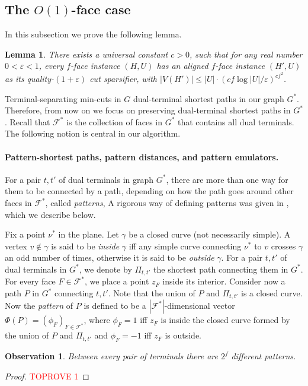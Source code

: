\documentclass[11pt]{article}
\newtheorem{lemma}[theorem]{Lemma}
\newtheorem{observation}[theorem]{Observation}
\theoremstyle{definition}
\newcommand{\fset}{{\mathcal{F}}}
\newcommand{\eps}{{\varepsilon}}
\newcounter{note}
\newcommand{\pat}{\Phi}
\begin{document}
\subsection{The $O(1)$-face case}

In this subsection we prove the following lemma.

\begin{lemma}
	\label{lem: O(1) face}
	There exists a universal constant $c>0$, such that for any real number $0<\eps<1$, every $f$-face instance $(H,U)$ has an aligned $f$-face instance $(H',U)$ as its quality-$(1+\eps)$ cut sparsifier, with $|V(H')|\le |U|\cdot (cf\log |U|/\eps)^{cf^2}$.
\end{lemma}

Terminal-separating min-cuts in $G$ dual-terminal shortest paths in our graph $G^*$. Therefore, from now on we focus on preserving dual-terminal shortest paths in $G^*$. Recall that $\fset^*$ is the collection of faces in $G^*$ that contains all dual terminals. The following notion is central in our algorithm.


\paragraph{Pattern-shortest paths, pattern distances, and pattern emulators.}
For a pair $t,t'$ of dual terminals in graph $G^*$, there are more than one way for them to be connected by a path, depending on how the path goes around other faces in $\fset^*$, called \emph{patterns},  A rigorous way of defining patterns was given in \cite{krauthgamer2017refined}, which we describe below.

Fix a point $\nu^*$ in the plane.
Let $\gamma$ be a closed curve (not necessarily simple). A vertex $v\notin \gamma$ is said to be \emph{inside} $\gamma$ iff any simple curve connecting $\nu^*$ to $v$ crosses $\gamma$ an odd number of times, otherwise it is said to be \emph{outside} $\gamma$.
For a pair $t,t'$ of dual terminals in $G^*$, we denote by $\Pi_{t,t'}$ the shortest path connecting them in $G^*$.
For every face $F\in \fset^*$, we place a point $z_F$ inside its interior. Consider now a path $P$ in $G^*$ connecting $t,t'$. Note that the union of $P$ and $\Pi_{t,t'}$ is a closed curve. Now the \emph{pattern} of $P$ is defined to be a $|\fset^*|$-dimensional vector $\pat(P)=(\phi_F)_{F\in \fset^*}$, where $\phi_F=1$ iff $z_F$ is inside the closed curve formed by the union of $P$ and $\Pi_{t,t'}$ and $\phi_F=-1$ iff $z_F$ is outside.

\begin{observation}
\label{obs: pattern}
Between every pair of terminals there are $2^{f}$ different patterns.
\end{observation}
\begin{proof}\textcolor{red}{TOPROVE 1}\end{proof}
\end{document}
